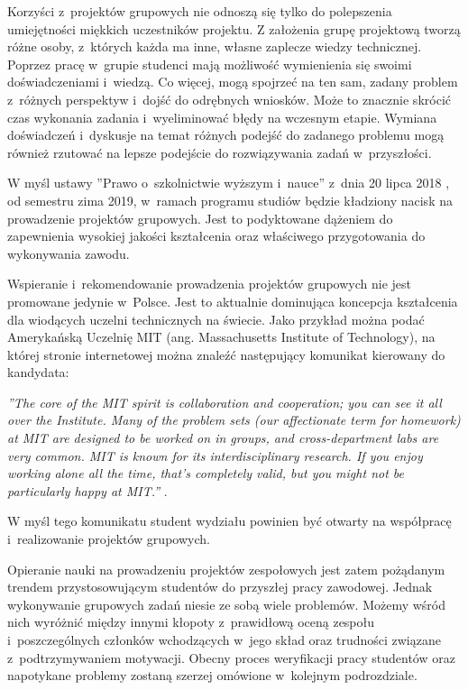 Korzyści z~projektów grupowych nie odnoszą się tylko do polepszenia umiejętności miękkich uczestników projektu.
Z założenia grupę projektową tworzą różne osoby, z~których każda ma inne, własne zaplecze wiedzy technicznej.
Poprzez pracę w~grupie studenci mają możliwość wymienienia się swoimi doświadczeniami i~wiedzą.
Co więcej, mogą spojrzeć na ten sam, zadany problem z~różnych perspektyw i~dojść do odrębnych wniosków.
Może to znacznie skrócić czas wykonania zadania i~wyeliminować błędy na wczesnym etapie. 
Wymiana doświadczeń i~dyskusje na temat różnych podejść do zadanego problemu mogą również rzutować na lepsze podejście do rozwiązywania zadań w~przyszłości.

W myśl ustawy ”Prawo o~szkolnictwie wyższym i~nauce” z~dnia 20 lipca 2018 \cite{higher-education-law}, od semestru zima 2019, w~ramach programu studiów będzie kładziony nacisk na prowadzenie projektów grupowych.
Jest to podyktowane dążeniem do zapewnienia wysokiej jakości kształcenia oraz właściwego przygotowania do wykonywania zawodu.

Wspieranie i~rekomendowanie prowadzenia projektów grupowych nie jest promowane jedynie w~Polsce.
Jest to aktualnie dominująca koncepcja kształcenia dla wiodących uczelni technicznych na świecie.
Jako przykład można podać Amerykańską Uczelnię MIT (ang. Massachusetts Institute of Technology), na której stronie internetowej można znaleźć następujący komunikat kierowany do kandydata:

\textit{”The core of the MIT spirit is collaboration and cooperation; you can see it all over the Institute.
Many of the problem sets (our affectionate term for homework) at MIT are designed to be worked on in groups, and cross-department labs are very common.
MIT is known for its interdisciplinary research.
If you enjoy working alone all the time, that’s completely valid, but you might not be particularly happy at MIT.”} \cite{mit-groups}.

W myśl tego komunikatu student wydziału powinien być otwarty na współpracę i~realizowanie projektów grupowych.

Opieranie nauki na prowadzeniu projektów zespołowych jest zatem pożądanym trendem przystosowującym studentów do przyszłej pracy zawodowej.
Jednak wykonywanie grupowych zadań niesie ze sobą wiele problemów.
Możemy wśród nich wyróżnić między innymi kłopoty z~prawidłową oceną zespołu i~poszczególnych członków wchodzących w~jego skład  oraz trudności związane z~podtrzymywaniem motywacji.
Obecny proces weryfikacji pracy studentów oraz napotykane problemy zostaną szerzej omówione w~kolejnym podrozdziale.

